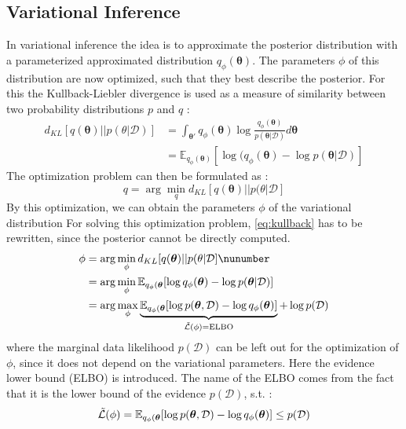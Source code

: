 \documentclass{article}
\begin{document}
\subsection{Variational Inference}
In variational inference the idea is to approximate the posterior distribution with a parameterized approximated distribution $q_\phi (\bm \theta)$. The parameters $\phi$ of this distribution are now optimized, such that they best describe the posterior. For this the Kullback-Liebler divergence is used as a measure of similarity between two probability distributions $p$ and $q$ \cite{murphy, BNNdistill}:
\begin{equation}
\begin{aligned}\label{eq:kullback}
    d_{KL} [q(\bm \theta)|| p(\theta|\mathcal{D})] &= \int_{\bm \theta'} q_\phi(\bm \theta) \log \frac{q_\phi(\bm \theta)}{p(\bm \theta|\mathcal{D})} d\bm \theta\\
    &=\mathbb{E}_{q_\phi(\bm \theta)}[\log(q_\phi(\bm \theta) - \log p(\bm \theta|\mathcal{D})]
\end{aligned}
\end{equation}
The optimization problem can then be formulated as \cite{murphy}:
\begin{equation}\label{eq:optprob}
    q = \arg \min_q d_{KL} [q(\bm \theta)|| p(\theta|\mathcal{D}]
\end{equation}
By this optimization, we can obtain the parameters $\phi$ of the variational distribution
For solving this optimization problem, \eqref{eq:kullback} has to be rewritten, since the posterior cannot be directly computed. 
\begin{align}
    \phi &= \arg \min_\phi d_{KL} [q(\bm \theta)|| p(\theta|\mathcal{D}]\nunumber\\
    &= \arg \min_\phi \mathbb{E}_{q_\phi(\bm \theta}[\log q_\phi(\bm \theta) - \log p(\bm \theta|\mathcal{D})]\nonumber\\
    &= \arg \max_\phi \underbrace{\mathbb{E}_{q_\phi(\bm \theta}[\log p(\bm \theta, \mathcal{D}) - \log q_\phi(\bm \theta)]}_{\Tilde{\mathcal{L}}(\phi) = \text{ELBO}} + \log p(\mathcal{D)}\\
\end{align}
where the marginal data likelihood $p(\mathcal{D})$ can be left out for the optimization of $\phi$, since it does not depend on the variational parameters. Here the evidence lower bound (ELBO) is introduced. The name of the ELBO comes from the fact that it is the lower bound of the evidence $p(\mathcal{D})$, s.t. \cite{murphy}:
\begin{equation}
    \Tilde{\mathcal{L}}(\phi) = \mathbb{E}_{q_\phi(\bm \theta}[\log p(\bm \theta, \mathcal{D}) - \log q_\phi(\bm \theta)] \leq p(\mathcal{D})
\end{equation}
\end{document}
